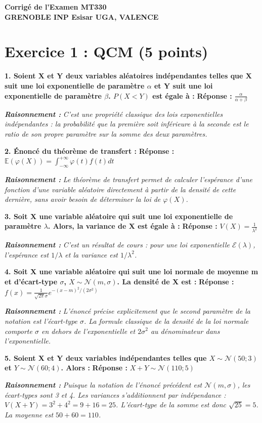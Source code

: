 \documentclass[11pt,a4paper]{article}
\newcommand{\raisonnement}[1]{
    \vspace{0.2cm}
    \noindent\textcolor{blue!80!black}{
        \textbf{\textit{Raisonnement : }} \textit{#1}
    }
    \vspace{0.2cm}
}
\begin{document}
\begin{center}
    \textbf{\Large Corrigé de l'Examen MT330} \\
    \vspace{0.2cm}
    \textbf{GRENOBLE INP Esisar UGA, VALENCE}
\end{center}

\vspace{0.5cm}

\section*{Exercice 1 : QCM (5 points)}

\textbf{1. Soient X et Y deux variables aléatoires indépendantes telles que X suit une loi exponentielle de paramètre $\alpha$ et Y suit une loi exponentielle de paramètre $\beta$. $P(X<Y)$ est égale à :}
\textbf{Réponse :} $\frac{\alpha}{\alpha+\beta}$
\raisonnement{C'est une propriété classique des lois exponentielles indépendantes : la probabilité que la première soit inférieure à la seconde est le ratio de son propre paramètre sur la somme des deux paramètres.}

\textbf{2. Énoncé du théorème de transfert :}
\textbf{Réponse :} $\mathbb{E}(\varphi(X)) = \int_{-\infty}^{+\infty} \varphi(t)f(t)dt$
\raisonnement{Le théorème de transfert permet de calculer l'espérance d'une fonction d'une variable aléatoire directement à partir de la densité de cette dernière, sans avoir besoin de déterminer la loi de $\varphi(X)$.}

\textbf{3. Soit X une variable aléatoire qui suit une loi exponentielle de paramètre $\lambda$. Alors, la variance de X est égale à :}
\textbf{Réponse :} $V(X) = \frac{1}{\lambda^2}$
\raisonnement{C'est un résultat de cours : pour une loi exponentielle $\mathcal{E}(\lambda)$, l'espérance est $1/\lambda$ et la variance est $1/\lambda^2$.}

\textbf{4. Soit X une variable aléatoire qui suit une loi normale de moyenne m et d'écart-type $\sigma$, $X \sim \mathcal{N}(m,\sigma)$. La densité de X est :}
\textbf{Réponse :} $f(x) = \frac{1}{\sqrt{2\pi}\sigma} e^{-(x-m)^2/(2\sigma^2)}$
\raisonnement{L'énoncé précise explicitement que le second paramètre de la notation est l'écart-type $\sigma$. La formule classique de la densité de la loi normale comporte $\sigma$ en dehors de l'exponentielle et $2\sigma^2$ au dénominateur dans l'exponentielle.}

\textbf{5. Soient X et Y deux variables indépendantes telles que $X \sim \mathcal{N}(50;3)$ et $Y \sim \mathcal{N}(60;4)$. Alors :}
\textbf{Réponse :} $X+Y \sim \mathcal{N}(110;5)$
\raisonnement{Puisque la notation de l'énoncé précédent est $\mathcal{N}(m, \sigma)$, les écart-types sont 3 et 4. Les variances s'additionnent par indépendance : $V(X+Y) = 3^2 + 4^2 = 9 + 16 = 25$. L'écart-type de la somme est donc $\sqrt{25} = 5$. La moyenne est $50 + 60 = 110$.}
\end{document}
